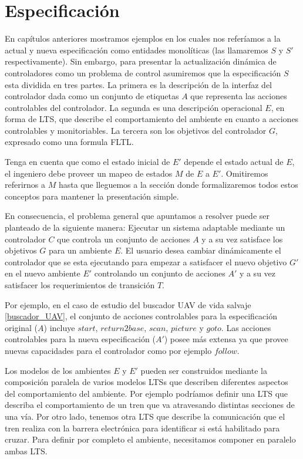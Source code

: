 \section{Especificación}

En capítulos anteriores mostramos ejemplos en los cuales nos referíamos a la actual y nueva especificación como
entidades monolíticas (las llamaremos $S$ y $S'$ respectivamente). Sin embargo, para presentar la actualización dinámica
de controladores como un problema de control asumiremos que la especificación $S$ esta dividida en tres partes. La
primera es la descripción de la interfaz del controlador dada como un conjunto de etiquetas $A$ que representa las
acciones controlables del controlador. La segunda es una descripción operacional $E$, en forma de LTS, que describe el
comportamiento del ambiente en cuanto a acciones controlables y monitoriables. La tercera son los objetivos del
controlador $G$, expresado como una formula FLTL.

Tenga en cuenta que como el estado inicial de $E'$ depende el estado actual de $E$, el ingeniero debe proveer un mapeo de estados
$M$ de $E$ a $E'$. Omitiremos referirnos a $M$ hasta que lleguemos a la sección donde formalizaremos todos estos
conceptos para mantener la presentación simple.

En consecuencia, el problema general que apuntamos a resolver puede ser planteado de la siguiente manera: Ejecutar
un sistema adaptable mediante un controlador $C$ que controla un conjunto de acciones $A$ y a su vez satisface los
objetivos $G$ para un ambiente $E$. El usuario desea cambiar dinámicamente el controlador que se esta ejecutando para
empezar a satisfacer el nuevo objetivo $G'$ en el nuevo ambiente $E'$ controlando un conjunto de acciones $A'$ y a su
vez satisfacer los requerimientos de transición $T$.

Por ejemplo, en el caso de estudio del buscador UAV de vida salvaje \ref{buscador_UAV}, el conjunto de acciones
controlables para la especificación original ($A$) incluye $start$, $return2base$, $scan$, $picture$ y $goto$. Las
acciones controlables para la nueva especificación ($A'$) posee más extensa ya que provee nuevas capacidades para el
controlador como por ejemplo $follow$.

Los modelos de los ambientes $E$ y $E'$ pueden ser construidos mediante la composición paralela de varios modelos LTSs
que describen diferentes aspectos del comportamiento del ambiente. Por ejemplo podríamos definir una LTS que describa el
comportamiento de un tren que va atravesando distintas secciones de una vía. Por otro lado, tenemos otra LTS que
describe la comunicación que el tren realiza con la barrera electrónica para identificar si está habilitado para cruzar.
Para definir por completo el ambiente, necesitamos componer en paralelo ambas LTS. 

